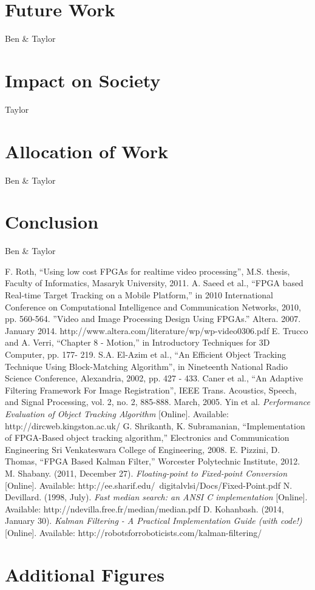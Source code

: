 \documentclass[12pt]{article} %
\begin{document}
\section{Future Work}
Ben \& Taylor
\section{Impact on Society}
Taylor
\section{Allocation of Work}
Ben \& Taylor
\section{Conclusion}
Ben \& Taylor
\newpage
\begin{thebibliography}{11}
F. Roth, “Using low cost FPGAs for realtime video processing”, M.S. thesis, Faculty of Informatics, Masaryk University, 2011.
A. Saeed et al., “FPGA based Real-time Target Tracking on a Mobile Platform,” in 2010 International Conference on Computational Intelligence and Communication Networks, 2010, pp. 560-564.
”Video and Image Processing Design Using FPGAs.” Altera. 2007. January 2014. 
http://www.altera.com/literature/wp/wp-video0306.pdf  
E. Trucco and A. Verri, “Chapter 8 - Motion,” in Introductory Techniques for 3D Computer, pp. 177- 219.
S.A. El-Azim et al., “An Efficient Object Tracking Technique Using Block-Matching Algorithm”, in Nineteenth National Radio Science Conference, Alexandria, 2002, pp. 427 - 433.
Caner et al., “An Adaptive Filtering Framework For Image Registration”, IEEE Trans. Acoustics, Speech, and Signal Processing, vol. 2, no. 2, 885-888. March, 2005. 
Yin et al. \textit{Performance Evaluation of Object Tracking Algorithm} [Online]. Available: http://dircweb.kingston.ac.uk/ 
G. Shrikanth, K. Subramanian, “Implementation of FPGA-Based object tracking algorithm,” Electronics and Communication Engineering Sri Venkateswara College of Engineering, 2008.
E. Pizzini, D. Thomas, “FPGA Based Kalman Filter,” Worcester Polytechnic Institute, 2012.
M. Shabany. (2011, December 27). \textit{Floating-point to Fixed-point Conversion} [Online]. Available: http://ee.sharif.edu/~digitalvlsi/Docs/Fixed-Point.pdf
N. Devillard. (1998, July). \textit{Fast median search: an ANSI C implementation} [Online]. Available: http://ndevilla.free.fr/median/median.pdf
D. Kohanbash. (2014, January 30). \textit{Kalman Filtering - A Practical Implementation Guide (with code!)} [Online]. Available: http://robotsforroboticists.com/kalman-filtering/
\end{thebibliography}
\newpage
\appendix
\appendixpage
\section{Additional Figures} \label{sec:add}
\end{document}

